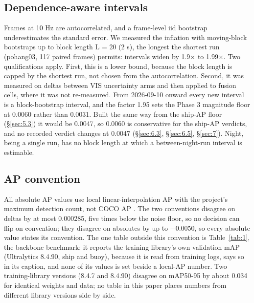 \documentclass[10pt]{article}
\begin{document}
\subsection{Dependence-aware intervals}\label{sec:5.4}
Frames at 10 Hz are autocorrelated, and a frame-level iid bootstrap underestimates the standard error. We measured the inflation with moving-block bootstraps \citep{kunsch1989the} up to block length L = 20 (2 s), the longest the shortest run (pohang03, 117 paired frames) permits: intervals widen by 1.9$\times$ to 1.99$\times$. Two qualifications apply. First, this is a lower bound, because the block length is capped by the shortest run, not chosen from the autocorrelation. Second, it was measured on deltas between VIS uncertainty arms and then applied to fusion cells, where it was not re-measured. From 2026-09-10 onward every new interval is a block-bootstrap interval, and the factor 1.95 sets the Phase 3 magnitude floor at 0.0060 rather than 0.0031. Built the same way from the ship-AP floor (\S\ref{sec:5.3}) it would be 0.0047, so 0.0060 is conservative for the ship-AP verdicts, and no recorded verdict changes at 0.0047 (\S\ref{sec:6.3}, \S\ref{sec:6.5}, \S\ref{sec:7}). Night, being a single run, has no block length at which a between-night-run interval is estimable.

\subsection{AP convention}\label{sec:5.5}
All absolute AP values use local linear-interpolation AP with the project's maximum detection count, not COCO AP \citep{lin2014microsoft}. The two conventions disagree on deltas by at most 0.000285, five times below the noise floor, so no decision can flip on convention; they disagree on absolutes by up to $-$0.0050, so every absolute value states its convention. The one table outside this convention is Table~\ref{tab:1}, the backbone benchmark: it reports the training library's own validation mAP (Ultralytics 8.4.90, ship and buoy), because it is read from training logs, says so in its caption, and none of its values is set beside a local-AP number. Two training-library versions (8.4.7 and 8.4.90) disagree on mAP50-95 by about 0.034 for identical weights and data; no table in this paper places numbers from different library versions side by side.
\end{document}
